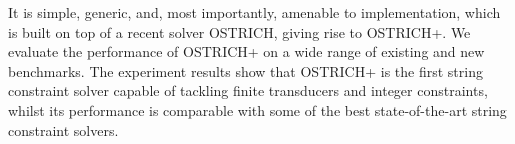 It is simple, generic, and, most importantly, amenable to implementation, which 
is built on top of a recent solver OSTRICH,
giving rise to OSTRICH+.
We evaluate the performance of OSTRICH+ on  a wide range of existing and new benchmarks. The experiment results show that OSTRICH+ is the first string constraint solver capable of tackling finite transducers and integer constraints, whilst
its performance is comparable with some of the best state-of-the-art string constraint solvers.
